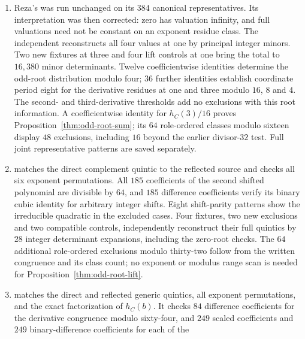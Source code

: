 \begin{enumerate}
coefficients, establish coordinate period eight modulo thirty-two.
The complete $384$ base rows therefore encode the higher tables.
The endpoint-divisibility test excludes $36$, $288$ and $2304$ classes,
respectively. These are finite residue tables, and their survivors
do not assert integer endpoint zeros or integral spectra.
\item Reza's  was run unchanged
on its $384$ canonical representatives. Its interpretation was then
corrected: zero has valuation infinity, and full valuations need not be
constant on an exponent residue class. The independent
 reconstructs all four values
at one by principal integer minors. Two new fixtures at three and four
lift controls at one bring the total to $16{,}380$ minor determinants.
Twelve coefficientwise identities determine the odd-root distribution
modulo four; $36$ further identities establish coordinate period eight
for the derivative residues at one and three modulo $16$, $8$ and $4$.
The second- and third-derivative thresholds add no exclusions with this
root information. A coefficientwise identity for $h_C(3)/16$ proves
Proposition~\ref{thm:odd-root-sum}; its $64$ role-ordered classes modulo
sixteen display $48$ exclusions, including $16$ beyond the earlier
divisor-$32$ test. Full joint representative patterns are saved separately.
\item {} matches the direct complement
quintic to the reflected source and checks all six exponent permutations.
All $185$ coefficients of the second shifted polynomial are divisible
by $64$, and $185$ difference coefficients verify its binary cubic
identity for arbitrary integer shifts. Eight shift-parity patterns show
the irreducible quadratic in the excluded cases. Four fixtures, two
new exclusions and two compatible controls, independently reconstruct
their full quintics by $28$ integer determinant expansions, including
the zero-root checks. The $64$ additional role-ordered exclusions
modulo thirty-two follow from the written congruence and its class count;
no exponent or modulus range scan is needed for
Proposition~\ref{thm:odd-root-lift}.
\item {} matches the direct
and reflected generic quintics, all exponent permutations, and the
exact factorization of $h_C(b)$. It checks $84$ difference coefficients
for the derivative congruence modulo sixty-four, and $249$ scaled
coefficients and $249$ binary-difference coefficients for each of the

\end{enumerate}

